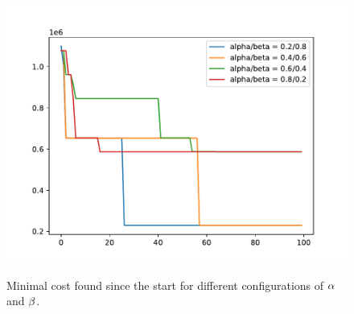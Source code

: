 \begin{figure}[h]
	\begin{centering}
		{\includegraphics[scale=0.8]{figures/experiments/alpha_beta.pdf}}
		\caption[Parameter study: $\protect\alpha$ and $\protect\beta$]{Minimal cost found since the start for different configurations of $\protect\alpha$ and $\protect\beta$.}
		\label{fig:alpha_beta}
	\end{centering}
\end{figure}
